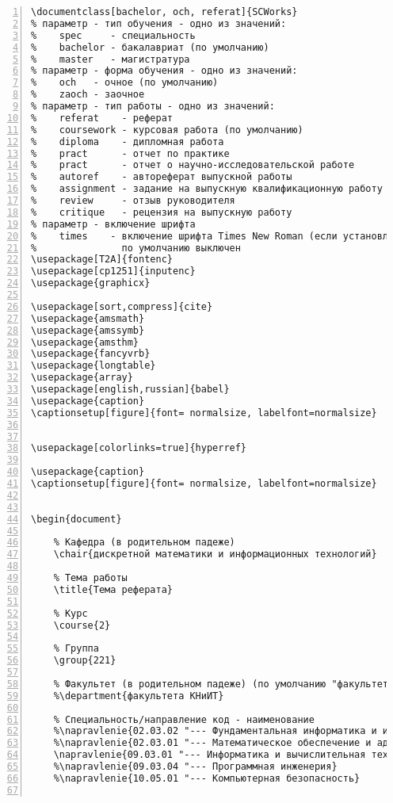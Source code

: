 \documentclass[bachelor, och, pract]{SCWorks}
\begin{document}
\begin{Verbatim}[fontsize=\small, numbers=left]
\documentclass[bachelor, och, referat]{SCWorks}
% параметр - тип обучения - одно из значений:
%    spec     - специальность
%    bachelor - бакалавриат (по умолчанию)
%    master   - магистратура
% параметр - форма обучения - одно из значений:
%    och   - очное (по умолчанию)
%    zaoch - заочное
% параметр - тип работы - одно из значений:
%    referat    - реферат
%    coursework - курсовая работа (по умолчанию)
%    diploma    - дипломная работа
%    pract      - отчет по практике
%    pract      - отчет о научно-исследовательской работе
%    autoref    - автореферат выпускной работы
%    assignment - задание на выпускную квалификационную работу
%    review     - отзыв руководителя
%    critique   - рецензия на выпускную работу
% параметр - включение шрифта
%    times    - включение шрифта Times New Roman (если установлен)
%               по умолчанию выключен
\usepackage[T2A]{fontenc}
\usepackage[cp1251]{inputenc}
\usepackage{graphicx}

\usepackage[sort,compress]{cite}
\usepackage{amsmath}
\usepackage{amssymb}
\usepackage{amsthm}
\usepackage{fancyvrb}
\usepackage{longtable}
\usepackage{array}
\usepackage[english,russian]{babel}
\usepackage{caption}
\captionsetup[figure]{font= normalsize, labelfont=normalsize}


\usepackage[colorlinks=true]{hyperref}

\usepackage{caption}
\captionsetup[figure]{font= normalsize, labelfont=normalsize}


\begin{document}
	
	% Кафедра (в родительном падеже)
	\chair{дискретной математики и информационных технологий}
	
	% Тема работы
	\title{Тема реферата}
	
	% Курс
	\course{2}
	
	% Группа
	\group{221}
	
	% Факультет (в родительном падеже) (по умолчанию "факультета КНиИТ")
	%\department{факультета КНиИТ}
	
	% Специальность/направление код - наименование
	%\napravlenie{02.03.02 "--- Фундаментальная информатика и информационные технологии}
	%\napravlenie{02.03.01 "--- Математическое обеспечение и администрирование информационных систем}
	\napravlenie{09.03.01 "--- Информатика и вычислительная техника}
	%\napravlenie{09.03.04 "--- Программная инженерия}
	%\napravlenie{10.05.01 "--- Компьютерная безопасность}
	

\end{Verbatim}
\end{document}
